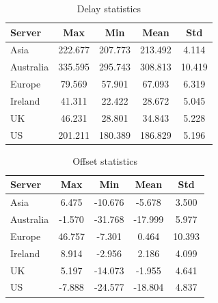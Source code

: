 \documentclass[a4paper]{article}
\begin{document}
\begin{table}[H]
    \centering
    \begin{tabular}{lcccc}
        \hline
        Server & Max & Min & Mean & Std \\ 
        \hline
        Asia       & 222.677 & 207.773 & 213.492 & 4.114 \\
        Australia  & 335.595 & 295.743 & 308.813 & 10.419 \\
        Europe     & 79.569  & 57.901  & 67.093  & 6.319  \\
        Ireland    & 41.311  & 22.422  & 28.672  & 5.045  \\
        UK         & 46.231  & 28.801  & 34.843  & 5.228  \\
        US         & 201.211 & 180.389 & 186.829 & 5.196  \\
        \hline
    \end{tabular}
    \caption{Delay statistics}
\end{table}

\begin{table}[H]
    \centering
    \begin{tabular}{lcccc}
        \hline
        Server & Max & Min & Mean & Std \\ 
        \hline
        Asia       & 6.475  & -10.676 & -5.678  & 3.500  \\
        Australia  & -1.570 & -31.768 & -17.999 & 5.977  \\
        Europe     & 46.757 & -7.301  & 0.464   & 10.393 \\
        Ireland    & 8.914  & -2.956  & 2.186   & 4.099  \\
        UK         & 5.197  & -14.073 & -1.955  & 4.641  \\
        US         & -7.888 & -24.577 & -18.804 & 4.837  \\
        \hline
    \end{tabular}
    \caption{Offset statistics}
\end{table}
\end{document}

